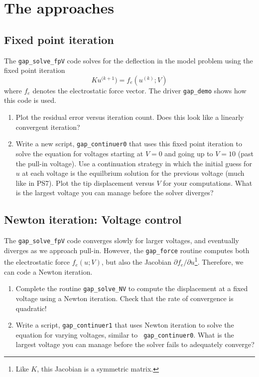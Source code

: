 \documentclass[12pt, leqno]{article} %
\begin{document}

\section{The approaches}

\subsection{Fixed point iteration}

The {\tt gap\_solve\_fpV} code solves for the deflection in the model
problem using the fixed point iteration
\[
  K u^{(k+1}) = f_e(u^{(k)}; V)
\]
where $f_e$ denotes the electrostatic force vector.  The driver
{\tt gap\_demo} shows how this code is used.

\begin{enumerate}
\item Plot the residual error versus iteration count.  Does this look
  like a linearly convergent iteration?
  
\item Write a new script, {\tt gap\_continuer0} that uses this fixed
  point iteration to solve the equation for voltages starting at $V =
  0$ and going up to $V = 10$ (past the pull-in voltage).  Use a
  continuation strategy in which the initial guess for $u$ at each
  voltage is the equilbrium solution for the previous voltage (much
  like in PS7).  Plot the tip displacement versus $V$ for your
  computations.  What is the largest voltage you can manage before the
  solver diverges?

\end{enumerate}

\subsection{Newton iteration: Voltage control}

The {\tt gap\_solve\_fpV} code converges slowly for larger voltages,
and eventually diverges as we approach pull-in.  However,
the {\tt gap\_force} routine computes both the electrostatic force
$f_e(u; V)$, but also the Jacobian $\partial f_e/\partial
u$\footnote{Like $K$, this Jacobian is a symmetric matrix.}.
Therefore, we can code a Newton iteration.
\begin{enumerate}

\item Complete the routine {\tt gap\_solve\_NV} to compute the
  displacement at a fixed voltage using a Newton iteration.  Check
  that the rate of convergence is quadratic!

\item Write a script, {\tt gap\_continuer1} that uses Newton iteration
  to solve the equation for varying voltages, similar to {\tt
    gap\_continuer0}.  What is the largest voltage you can manage
  before the solver fails to adequately converge?

\end{enumerate}
\end{document}
